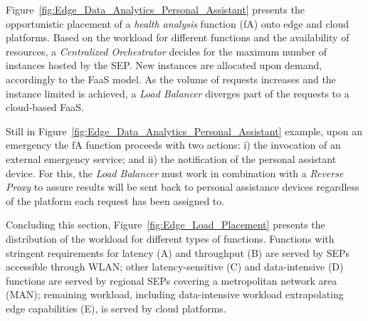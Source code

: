 


Figure~\ref{fig:Edge_Data_Analytics_Personal_Assistant} presents the opportunistic placement of a \textit{health analysis} function (fA) onto edge and cloud platforms. Based on the workload for different functions and the availability of resources, a \textit{Centralized Orchestrator} decides for the maximum number of instances hosted by the SEP.
New instances are allocated upon demand, accordingly to the FaaS model. As the volume of requests increases and the instance limited is achieved, a \textit{Load Balancer} diverges part of the requests to a cloud-based FaaS.


Still in Figure~\ref{fig:Edge_Data_Analytics_Personal_Assistant} example, upon an emergency the fA function proceeds with two actions: i) the invocation of an external emergency service; and ii) the notification of the personal assistant device. For this, the \textit{Load Balancer} must work in combination with a \textit{Reverse Proxy} to assure results will be sent back to personal assistance devices regardless of the platform each request has been assigned to.

Concluding this section, Figure~\ref{fig:Edge_Load_Placement} presents the distribution of the workload for different types of functions. Functions with stringent requirements for latency (A) and throughput (B) are served by SEPs accessible through WLAN; other latency-sensitive (C) and data-intensive (D) functions are served by regional SEPs covering a metropolitan network area (MAN); remaining workload, including data-intensive workload extrapolating edge capabilities (E), is served by cloud platforms. 

